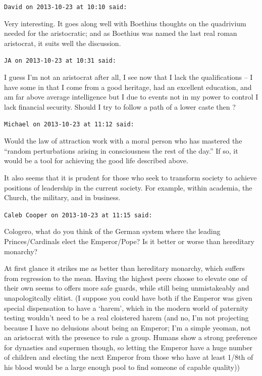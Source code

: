 \begin{footnotesize}
\begin{sffamily}
\texttt{David on 2013-10-23 at 10:10 said:}

Very interesting. It goes along well with Boethius thoughts on the quadrivium needed for the aristocratic; and as Boethius was named the last real roman aristocrat, it suits well the discussion.

\hfill

\texttt{JA on 2013-10-23 at 10:31 said:}

I guess I'm not an aristocrat after all, I see now that I lack the qualifications -- I have some in that I come from a good heritage, had an excellent education, and am far above average intelligence but I due to events not in my power to control I lack financial security. Should I try to follow a path of a lower caste then ?

\hfill

\texttt{Michael on 2013-10-23 at 11:12 said:}

Would the law of attraction work with a moral person who has mastered the ``random perturbations arising in consciousness the rest of the day.'' If so, it would be a tool for achieving the good life described above.

It also seems that it is prudent for those who seek to transform society to achieve positions of leadership in the current society. For example, within academia, the Church, the military, and in business.

\hfill

\texttt{Caleb Cooper on 2013-10-23 at 11:15 said:}

Cologero, what do you think of the German system where the leading Princes/Cardinals elect the Emperor/Pope? Is it better or worse than hereditary monarchy?

At first glance it strikes me as better than hereditary monarchy, which suffers from regression to the mean. Having the highest peers choose to elevate one of their own seems to offers more safe guards, while still being unmistakeably and unapologitcally elitist. (I suppose you could have both if the Emperor was given special dispensation to have a `harem', which in the modern world of paternity testing wouldn't need to be a real cloistered harem (and no, I'm not projecting because I have no delusions about being an Emperor; I'm a simple yeoman, not an aristocrat with the presence to rule a group. Humans show a strong preference for dynasties and supermen though, so letting the Emperor have a huge number of children and electing the next Emperor from those who have at least 1/8th of his blood would be a large enough pool to find someone of capable quality))


\end{sffamily}
\end{footnotesize}
